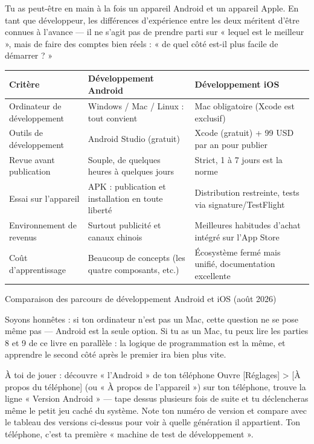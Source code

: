 Tu as peut-être en main à la fois un appareil Android et un appareil Apple. En tant que développeur, les différences d'expérience entre les deux méritent d'être connues à l'avance — il ne s'agit pas de prendre parti sur « lequel est le meilleur », mais de faire des comptes bien réels : « de quel côté est-il plus facile de démarrer ? »

\begin{center}
\begin{tabularx}{\linewidth}{|X|X|X|}
\hline
\textbf{Critère} & \textbf{Développement Android} & \textbf{Développement iOS} \tabularnewline
\hline
Ordinateur de développement & Windows / Mac / Linux : tout convient & Mac obligatoire (Xcode est exclusif) \tabularnewline
Outils de développement & Android Studio (gratuit) & Xcode (gratuit) + 99 USD par an pour publier \tabularnewline
Revue avant publication & Souple, de quelques heures à quelques jours & Strict, 1 à 7 jours est la norme \tabularnewline
Essai sur l'appareil & APK : publication et installation en toute liberté & Distribution restreinte, tests via signature/TestFlight \tabularnewline
Environnement de revenus & Surtout publicité et canaux chinois & Meilleures habitudes d'achat intégré sur l'App Store \tabularnewline
Coût d'apprentissage & Beaucoup de concepts (les quatre composants, etc.) & Écosystème fermé mais unifié, documentation excellente \tabularnewline
\hline
\end{tabularx}
\end{center}

\begin{center}\small\color{gray}Comparaison des parcours de développement Android et iOS (août 2026)\end{center}

Soyons honnêtes : si ton ordinateur n'est pas un Mac, cette question ne se pose même pas — Android est la seule option. Si tu as un Mac, tu peux lire les parties 8 et 9 de ce livre en parallèle : la logique de programmation est la même, et apprendre le second côté après le premier ira bien plus vite.

\begin{tcbpractice}{À toi de jouer : découvre « l'Android » de ton téléphone}
Ouvre [Réglages] > [À propos du téléphone] (ou « À propos de l'appareil ») sur ton téléphone, trouve la ligne « Version Android » — tape dessus plusieurs fois de suite et tu déclencheras même le petit jeu caché du système. Note ton numéro de version et compare avec le tableau des versions ci-dessus pour voir à quelle génération il appartient. Ton téléphone, c'est ta première « machine de test de développement ».

\end{tcbpractice}

